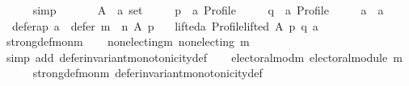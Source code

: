\begin{isabellebody}
\ \ \ \ \isamarkupfalse%
\ simp\isanewline
{}\isamarkupfalse%
\isanewline
\ \ \isamarkupfalse%
\isanewline
\ \ \ \ A\ {\isacharcolon}{\kern0pt}{\isacharcolon}{\kern0pt}\ {\isachardoublequoteopen}{\isacharprime}{\kern0pt}a\ set{\isachardoublequoteclose}\ \isanewline
\ \ \ \ p\ {\isacharcolon}{\kern0pt}{\isacharcolon}{\kern0pt}\ {\isachardoublequoteopen}{\isacharprime}{\kern0pt}a\ Profile{\isachardoublequoteclose}\ \isanewline
\ \ \ \ q\ {\isacharcolon}{\kern0pt}{\isacharcolon}{\kern0pt}\ {\isachardoublequoteopen}{\isacharprime}{\kern0pt}a\ Profile{\isachardoublequoteclose}\ \isanewline
\ \ \ \ a\ {\isacharcolon}{\kern0pt}{\isacharcolon}{\kern0pt}\ {\isachardoublequoteopen}{\isacharprime}{\kern0pt}a{\isachardoublequoteclose}\isanewline
\ \ \isamarkupfalse%
\isanewline
\ \ defer{\isacharunderscore}{\kern0pt}a{\isacharunderscore}{\kern0pt}p{\isacharcolon}{\kern0pt}\ {\isachardoublequoteopen}a\ {\isasymin}\ defer\ {\isacharparenleft}{\kern0pt}m\ {\isasymtriangleright}\ n{\isacharparenright}{\kern0pt}\ A\ p{\isachardoublequoteclose}\ \isanewline
\ \ lifted{\isacharunderscore}{\kern0pt}a{\isacharcolon}{\kern0pt}\ {\isachardoublequoteopen}Profile{\isachardot}{\kern0pt}lifted\ A\ p\ q\ a{\isachardoublequoteclose}\isanewline
\ \ \isamarkupfalse%
\ strong{\isacharunderscore}{\kern0pt}def{\isacharunderscore}{\kern0pt}mon{\isacharunderscore}{\kern0pt}m\isanewline
\ \ \isamarkupfalse%
\ non{\isacharunderscore}{\kern0pt}electing{\isacharunderscore}{\kern0pt}m{\isacharcolon}{\kern0pt}\ {\isachardoublequoteopen}non{\isacharunderscore}{\kern0pt}electing\ m{\isachardoublequoteclose}\isanewline
\ \ \ \ \isamarkupfalse%
\ {\isacharparenleft}{\kern0pt}simp\ add{\isacharcolon}{\kern0pt}\ defer{\isacharunderscore}{\kern0pt}invariant{\isacharunderscore}{\kern0pt}monotonicity{\isacharunderscore}{\kern0pt}def{\isacharparenright}{\kern0pt}\isanewline
\ \ \isamarkupfalse%
\ electoral{\isacharunderscore}{\kern0pt}mod{\isacharunderscore}{\kern0pt}m{\isacharcolon}{\kern0pt}\ {\isachardoublequoteopen}electoral{\isacharunderscore}{\kern0pt}module\ m{\isachardoublequoteclose}\isanewline
\ \ \ \ \isamarkupfalse%
\ strong{\isacharunderscore}{\kern0pt}def{\isacharunderscore}{\kern0pt}mon{\isacharunderscore}{\kern0pt}m\ defer{\isacharunderscore}{\kern0pt}invariant{\isacharunderscore}{\kern0pt}monotonicity{\isacharunderscore}{\kern0pt}def\isanewline
\ \ \ \ \isamarkupfalse%

\end{isabellebody}
